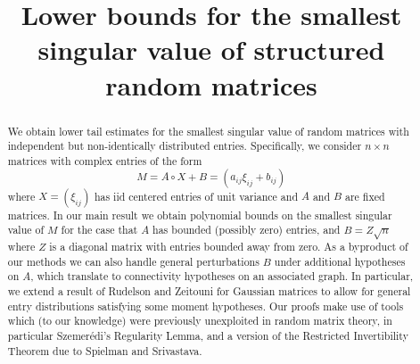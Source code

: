 \documentclass[aop,preprint]{imsart}
\theoremstyle{plain}
\theoremstyle{definition}
\theoremstyle{remark}
\numberwithin{equation}{section}
\numberwithin{theorem}{section}
\begin{document}
\begin{frontmatter}

\title{Lower bounds for the smallest singular value of structured random matrices}

\author{ }
\address{Department of Mathematics\\ 
University of California\\
Los Angeles, CA 90095-1555\\ 
}


\begin{abstract}
We obtain lower tail estimates for the smallest singular value of random matrices with independent but non-identically distributed entries.
Specifically, we consider $n\times n$ matrices with complex entries of the form
\[
M = A\circ X + B = (a_{ij}\xi_{ij} + b_{ij})
\]
where $X=(\xi_{ij})$ has iid centered entries of unit variance and $A$ and $B$ are fixed matrices.
In our main result we obtain polynomial bounds on the smallest singular value of $M$ for the case that $A$ has bounded (possibly zero) entries, and $B= Z\sqrt{n}$ where $Z$ is a diagonal matrix with entries bounded away from zero. 
As a byproduct of our methods we can also handle general perturbations $B$ under additional hypotheses on $A$, which translate to connectivity hypotheses on an associated graph. 
In particular, we extend a result of Rudelson and Zeitouni for Gaussian matrices to allow for general entry distributions satisfying some moment hypotheses.
Our proofs make use of tools which (to our knowledge) were previously unexploited in random matrix theory, in particular Szemer\'edi's Regularity Lemma, and a version of the Restricted Invertibility Theorem due to Spielman and Srivastava.
\end{abstract}

\begin{keyword}[class=MSC]
\end{keyword}

\begin{keyword}
\end{keyword}

\end{frontmatter}
\end{document}
